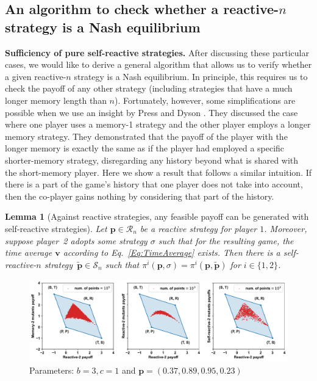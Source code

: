 \documentclass[11pt]{article}
\theoremstyle{plainCl1}
\newtheorem{lemma}{Lemma}
\theoremstyle{plainCl2}
\begin{document}

\subsection{An algorithm to check whether a reactive-$n$ strategy is a Nash equilibrium}
\label{Sec:Algorithm}

{\bf Sufficiency of pure self-reactive strategies.}
After discussing these particular cases, we would like to derive a general algorithm that allows us to verify whether a given reactive-$n$ strategy is a Nash equilibrium. 
In principle, this requires us to check the payoff of any other strategy (including strategies that have a much longer memory length than $n$). Fortunately, however, some simplifications are possible when we use an insight by Press and Dyson \cite{press:PNAS:2012}.
They discussed the case where one player uses a memory-1
strategy and the other player employs a longer memory strategy. They
demonstrated that the payoff of the player with the longer memory is exactly the
same as if the player had employed a specific shorter-memory strategy,
disregarding any history beyond what is shared with the short-memory player.
Here we show a result that follows a similar intuition. 
If there is a part of the game's history that one player does not take into account, then the co-player gains nothing by
considering that part of the history. 

\begin{lemma}[Against reactive strategies, any feasible payoff can be generated with self-reactive strategies] \label{lemma:self_reactive_sufficiency}
 Let $\mathbf{p}\!\in\!\mathcal{R}_n$ be a reactive strategy for player $1$. 
 Moreover, suppose player~2 adopts some strategy $\sigma$ such that for the resulting game, the time average $\mathbf{v}$ according to Eq.~\eqref{Eq:TimeAverage} exists. 
 Then there is a self-reactive-$n$ strategy~$\mathbf{\tilde p}\!\in\!\mathcal{S}_n$ such that $\pi^i(\mathbf{p},\sigma)\! = \!\pi^i(\mathbf{p},\mathbf{\tilde{p}})$ for $i\!\in\!\{1,2\}$.
\end{lemma}

\begin{figure}[t!]
    \centering
    \includegraphics[width=\textwidth]{figures/sufficiency_of_self_reactive_numerical_example_n_2.pdf}
    \caption{Parameters: $b=3, c=1$ and $\mathbf{p}=(0.37, 0.89, 0.95, 0.23)$}
    \label{fig:enter-label}
\end{figure}
\end{document}
